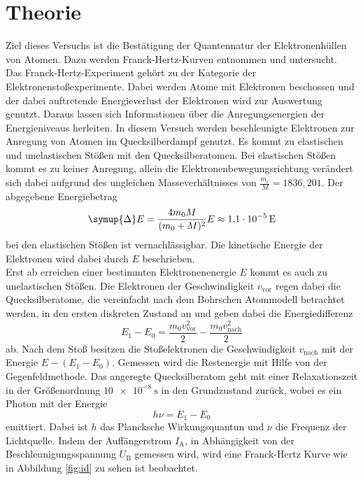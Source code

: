 \section{Theorie}
\label{sec:Theorie}
Ziel dieses Versuchs ist die Bestätigung der Quantennatur der Elektronenhüllen von Atomen.
Dazu werden Franck-Hertz-Kurven entnommen und untersucht.
\\
Das Franck-Hertz-Experiment gehört zu der Kategorie der Elektronenstoßexperimente. Dabei werden Atome mit Elektronen beschossen und der dabei auftretende Energieverlust der Elektronen
wird zur Auswertung genutzt. Daraus lassen sich Informationen über die Anregungsenergien der Energieniveaus herleiten.
In diesem Versuch werden beschleunigte Elektronen zur Anregung von Atomen im Quecksilberdampf genutzt. Es kommt zu elastischen und unelastischen Stößen mit den Quecksilberatomen.
Bei elastischen Stößen kommt es zu keiner Anregung, allein die Elektronenbewegungsrichtung verändert sich dabei aufgrund des ungleichen Masseverhältnisses von $\frac{m_e}{M}= 1836,201$.
Der abgegebene Energiebetrag 
\begin{equation}
    \symup{\Delta} E = \frac{4 m_0 M}{(m_0 + M)^2} E \approx \SI{1.1 e-5}{E}
\end{equation}
bei den elastischen Stößen ist vernachlässigbar. Die kinetische Energie der Elektronen wird dabei durch $E$ beschrieben.
\\
Erst ab erreichen einer bestimmten Elektronenenergie $E$ kommt es auch zu unelastischen Stößen. Die Elektronen der Geschwindigkeit $v_\text{vor}$ regen dabei die 
Quecksilberatome, die vereinfacht nach dem Bohrschen Atommodell betrachtet werden, in den ersten diskreten Zustand an und geben dabei die Energiedifferenz
\begin{equation}
    E_1-E_0 = \frac{m_0 v_\text{vor}^2}{2} - \frac{m_0 v_\text{nach}^2}{2}
\end{equation}
ab. Nach dem Stoß besitzen die Stoßelektronen die Geschwindigkeit $v_\text{nach}$ mit der Energie $E - (E_1 - E_0)$. Gemessen wird die Restenergie mit Hilfe von der Gegenfeldmethode.
Das angeregte Quecksilberatom geht mit einer Relaxationszeit in der Größenordnung $ \SI{10 e-8}{\second}$ in den Grundzustand zurück, wobei es ein Photon mit der Energie 
\begin{equation}
    h \nu = E_1 - E_0
\end{equation}
emittiert. Dabei ist $h$ das Plancksche Wirkungsquantun und $\nu$ die Frequenz der Lichtquelle.
Indem der Auffängerstrom $I_\text{A}$, in Abhängigkeit von der Beschleunigungsspannung $U_\text{B}$ gemessen wird, wird eine Franck-Hertz Kurve wie in Abbildung \ref{fig:id} zu sehen ist beobachtet. 
